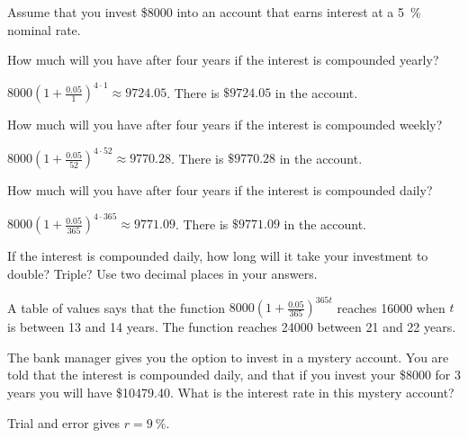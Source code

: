 \begin{exercises}
			
\begin{problem}
Assume that you invest \$8000 into an account that earns interest at a \SI{5}{\percent} nominal rate. 
\begin{subproblem}
	How much will you have after four years if the interest is compounded yearly?
	\begin{shortsolution}
		$8000\left(1+\frac{0.05}{1}\right)^{4\cdot 1}\approx 9724.05$. There is  $\$9724.05$ in the account.
	\end{shortsolution}
\end{subproblem}
\begin{subproblem}
	How much will you have after four years if the interest is compounded weekly?
	\begin{shortsolution}
		$8000\left(1+\frac{0.05}{52}\right)^{4\cdot 52}\approx 9770.28$.  There is  $\$9770.28$ in the account.
	\end{shortsolution}
\end{subproblem}
\begin{subproblem}
	How much will you have after four years if the interest is compounded daily?
	\begin{shortsolution}
		$8000\left(1+\frac{0.05}{365}\right)^{4\cdot 365}\approx 9771.09$. There is  $\$9771.09$ in the account.
	\end{shortsolution}
\end{subproblem}
\begin{subproblem}
	If the interest is compounded daily, how long will it take your 
	investment to double? Triple?
	Use two decimal places in your answers.
	\begin{shortsolution}
		A table of values says that the function $8000\left(1+\frac{0.05}{365}\right)^{365t}$ reaches 16000 
		when $t$ is between 13 and 14 years. The function reaches 24000 between 21 and 22 years.
	\end{shortsolution}
\end{subproblem}
\begin{subproblem}
	The bank manager gives you the option to invest in a mystery account. You are 
	told that the interest is compounded daily, and that if you invest your \$8000 
	for 3 years you will have \$10479.40. What is the interest rate in this 
	mystery account?
	\begin{shortsolution}
		Trial and error gives $r=\SI{9}{\percent}$.
	\end{shortsolution}
\end{subproblem}
\end{problem}
			

\end{exercises}
